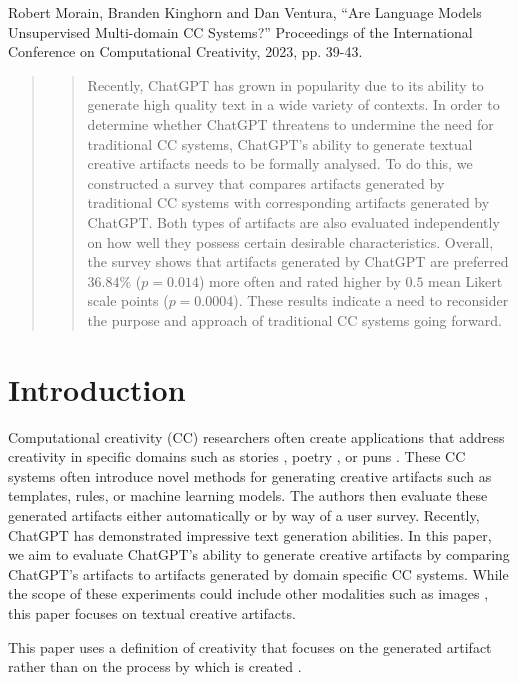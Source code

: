 \documentclass[phd,electronic,oneside,twosidetoc,letterpaper,chaptercenter,parttop,lof]{byumsphd}
\begin{document}
\noindent
Robert Morain, Branden Kinghorn and Dan Ventura, ``Are Language Models Unsupervised Multi-domain CC Systems?'' Proceedings of the International Conference on Computational Creativity, 2023, pp. 39-43.
\begin{abstract}
\begin{quote}

Recently, ChatGPT has grown in popularity due to its ability to generate high quality text in a wide variety of contexts.  In order to determine whether ChatGPT threatens to undermine the need for traditional CC systems, ChatGPT's ability to generate textual creative artifacts needs to be formally analysed.
To do this, we constructed a survey that compares artifacts generated by traditional CC systems with corresponding artifacts generated by ChatGPT.
Both types of artifacts are also evaluated independently on how well they possess certain desirable characteristics.  Overall, the survey shows that artifacts generated by ChatGPT are preferred $36.84\%$ ($p=0.014$) more often and rated higher by $0.5$ mean Likert scale points ($p=0.0004$).
These results indicate a need to reconsider the purpose and approach of traditional CC systems going forward.

\end{quote}
\end{abstract}

\section{Introduction}

Computational creativity (CC) researchers often create applications that address creativity in specific domains such as stories \cite{perez2001mexica}, poetry \cite{boggia2022poetry}, or puns \cite{ritchie2003jape}.
These CC systems often introduce novel methods for generating creative artifacts such as templates, rules, or machine learning models.
The authors then evaluate these generated artifacts either automatically or by way of a user survey. 
Recently, ChatGPT \cite{chatGPT} has demonstrated impressive text generation abilities. 
In this paper, we aim to evaluate ChatGPT's ability to generate creative artifacts by comparing ChatGPT's artifacts to artifacts generated by domain specific CC systems.
While the scope of these experiments could include other modalities such as images \cite{ramesh2021dalle}, this paper focuses on textual creative artifacts.

This paper uses a definition of creativity that focuses on the generated artifact rather than on the process by which is created \cite{wiggins2006creativity}.
\end{document}
